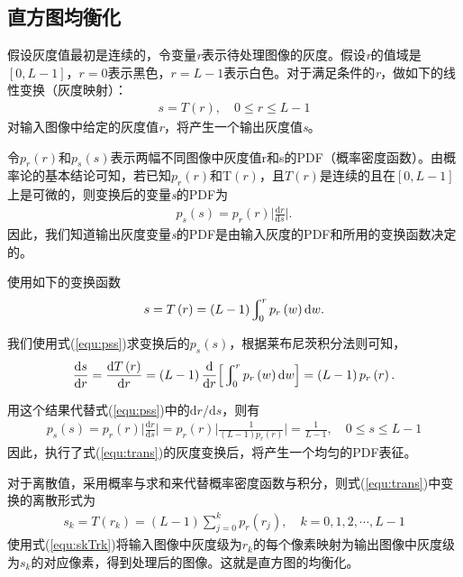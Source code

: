 \documentclass{hitreport}
\begin{document}
\subsection{直方图均衡化}\label{sec:junhenghua}

假设灰度值最初是连续的，令变量\textit{r}表示待处理图像的灰度。假设\textit{r}的值域是$\left[0,L-1\right]$，$r=0$表示黑色，$r=L-1$表示白色。对于满足条件的\textit{r}，做如下的线性变换（灰度映射）：
\begin{align}
s=T\left(r\right),\quad 0\le r\le L-1
\end{align}
对输入图像中给定的灰度值\textit{r}，将产生一个输出灰度值\textit{s}。

令$p_r\left(r\right)$和$p_s\left(s\right)$表示两幅不同图像中灰度值r和s的PDF（概率密度函数）。由概率论的基本结论可知，若已知$p_r\left(r\right)$和T$\left(r\right)$，且$T\left(r\right)$是连续的且在$\left[0,L-1\right]$上是可微的，则变换后的变量\textit{s}的PDF为
\begin{align}\label{equ:pss}
p_s\left(s\right)=p_r\left(r\right)\Big|\frac{\mathrm{d}r}{\mathrm{d}s}\Big|.
\end{align}
因此，我们知道输出灰度变量\textit{s}的PDF是由输入灰度的PDF和所用的变换函数决定的。

使用如下的变换函数
\begin{align}\label{equ:trans}
s=T\left(r\right)=\left(L-1\right)\varint\nolimits_{0}^{r}p_r\left(w\right)\mathrm{d}w.
\end{align}

我们使用式(\ref{equ:pss})求变换后的$p_s\left(s\right)$，根据莱布尼茨积分法则可知，
\begin{align}
\frac{\mathrm{d}s}{\mathrm{d}r} = \frac{\mathrm{d} T\left(r\right)}{\mathrm{d}r} = \left(L-1\right)\frac{\mathrm{d}}{\mathrm{d}r}\Big[\varint\nolimits_{0}^{r}p_r\left(w\right)\mathrm{d}w\Big] = \left(L-1\right)p_r\left(r\right).
\end{align}

用这个结果代替式(\ref{equ:pss})中的$\left. \mathrm{d}r/\mathrm{d}s \right.$，则有
\begin{align}
p_s\left(s\right)=p_r\left(r\right)\Big|\frac{\mathrm{d}r}{\mathrm{d}s}\Big| = p_r\left(r\right)\Big|\frac{1}{\left(L-1\right)p_r\left(r\right)}\Big| = \frac{1}{L-1},\quad 0\le s\le L-1
\end{align}
因此，执行了式(\ref{equ:trans})的灰度变换后，将产生一个均匀的PDF表征。

对于离散值，采用概率与求和来代替概率密度函数与积分，则式(\ref{equ:trans})中变换的离散形式为
\begin{align}\label{equ:skTrk}
s_k = T\left(r_k\right) = \left(L-1\right) \sum_{j=0}^{k}p_r\left(r_j\right),\quad k=0,1,2,\cdots,L-1
\end{align}
使用式(\ref{equ:skTrk})将输入图像中灰度级为$r_k$的每个像素映射为输出图像中灰度级为$s_k$的对应像素，得到处理后的图像。这就是直方图的均衡化。
\end{document}
